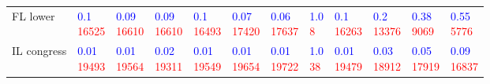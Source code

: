 \begin{tabular}{llllllllllll}
FL lower    &   \makecell{\textcolor{blue}{0.1} \\ \textcolor{red}{16525}} &  \makecell{\textcolor{blue}{0.09} \\ \textcolor{red}{16610}} &  \makecell{\textcolor{blue}{0.09} \\ \textcolor{red}{16610}} &   \makecell{\textcolor{blue}{0.1} \\ \textcolor{red}{16493}} &  \makecell{\textcolor{blue}{0.07} \\ \textcolor{red}{17420}} &  \makecell{\textcolor{blue}{0.06} \\ \textcolor{red}{17637}} &     \makecell{\textcolor{blue}{1.0} \\ \textcolor{red}{8}} &   \makecell{\textcolor{blue}{0.1} \\ \textcolor{red}{16263}} &   \makecell{\textcolor{blue}{0.2} \\ \textcolor{red}{13376}} &   \makecell{\textcolor{blue}{0.38} \\ \textcolor{red}{9069}} &   \makecell{\textcolor{blue}{0.55} \\ \textcolor{red}{5776}} \\
IL congress &  \makecell{\textcolor{blue}{0.01} \\ \textcolor{red}{19493}} &  \makecell{\textcolor{blue}{0.01} \\ \textcolor{red}{19564}} &  \makecell{\textcolor{blue}{0.02} \\ \textcolor{red}{19311}} &  \makecell{\textcolor{blue}{0.01} \\ \textcolor{red}{19549}} &  \makecell{\textcolor{blue}{0.01} \\ \textcolor{red}{19654}} &  \makecell{\textcolor{blue}{0.01} \\ \textcolor{red}{19722}} &    \makecell{\textcolor{blue}{1.0} \\ \textcolor{red}{38}} &  \makecell{\textcolor{blue}{0.01} \\ \textcolor{red}{19479}} &  \makecell{\textcolor{blue}{0.03} \\ \textcolor{red}{18912}} &  \makecell{\textcolor{blue}{0.05} \\ \textcolor{red}{17919}} &  \makecell{\textcolor{blue}{0.09} \\ \textcolor{red}{16837}} \\

\end{tabular}
